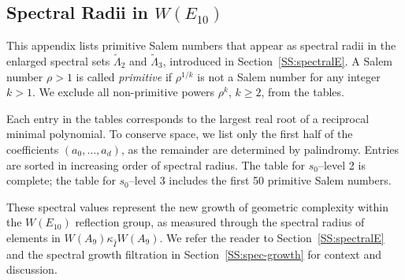 \documentclass[11pt]{amsart}
\numberwithin{equation}{section}
\begin{document}
\begin{appendices}
\section{Spectral Radii in $W(E_{10})$}\label{B:tables}
This appendix lists primitive Salem numbers that appear as spectral radii
in the enlarged spectral sets \(\tilde\Lambda_2\) and \(\tilde\Lambda_3\),
introduced in Section~\ref{SS:spectralE}.
A Salem number \(\rho > 1\) is called \emph{primitive} if \(\rho^{1/k}\)
is not a Salem number for any integer \(k > 1\).
We exclude all non-primitive powers \(\rho^k\), \(k \ge 2\), from the tables.

Each entry in the tables corresponds to the largest real root of
a reciprocal minimal polynomial.
To conserve space, we list only the first half of the coefficients
\((a_0,\dots,a_d)\), as the remainder are determined by palindromy.
Entries are sorted in increasing order of spectral radius.
The table for \(s_0\)--level 2 is complete; the table for \(s_0\)--level 3
includes the first 50 primitive Salem numbers.

These spectral values represent the new growth of geometric complexity
within the \(W(E_{10})\) reflection group, as measured through the
spectral radius of elements in \(W(A_9)\kappa_{\widehat I}W(A_9)\).
We refer the reader to Section~\ref{SS:spectralE} and the spectral
growth filtration in Section~\ref{SS:spec-growth} for context and discussion.



\end{appendices}
\end{document}
